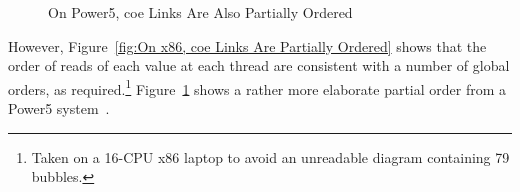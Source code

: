 \documentclass[10]{article}
\begin{document}
\begin{figure}[tb]
\begin{center}
\caption{On Power5, coe Links Are Also Partially Ordered}
\label{fig:On Power5, coe Links Are Also Partially Ordered}
\end{center}
\end{figure}

However, Figure~\ref{fig:On x86, coe Links Are Partially Ordered}
shows that the order of reads of each value at each thread are
consistent with a number of global orders, as required.\footnote{
	Taken on a 16-CPU x86 laptop to avoid an unreadable
	diagram containing 79 bubbles.}
Figure~\ref{fig:On Power5, coe Links Are Also Partially Ordered}
shows a rather more elaborate partial order from a Power5
system~\cite{McKenney2018ParallelProgramming-2018-12-08a}.
\end{document}
